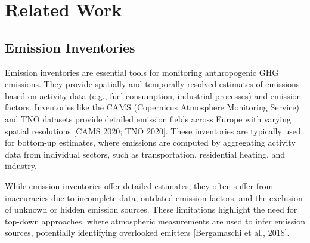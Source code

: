 
\chapter{Related Work}\label{chapter:related_work}

\section{Emission Inventories}
Emission inventories are essential tools for monitoring anthropogenic GHG emissions.
They provide spatially and temporally resolved estimates of emissions based on activity data (e.g., fuel consumption, industrial processes) and emission factors.
Inventories like the CAMS (Copernicus Atmosphere Monitoring Service) and TNO datasets provide detailed emission fields across Europe with varying spatial resolutions [CAMS 2020; TNO 2020].
These inventories are typically used for bottom-up estimates, where emissions are computed by aggregating activity data from individual sectors, such as transportation, residential heating, and industry.

While emission inventories offer detailed estimates, they often suffer from inaccuracies due to incomplete data, outdated emission factors, and the exclusion of unknown or hidden emission sources.
These limitations highlight the need for top-down approaches, where atmospheric measurements are used to infer emission sources, potentially identifying overlooked emitters [Bergamaschi et al., 2018].

